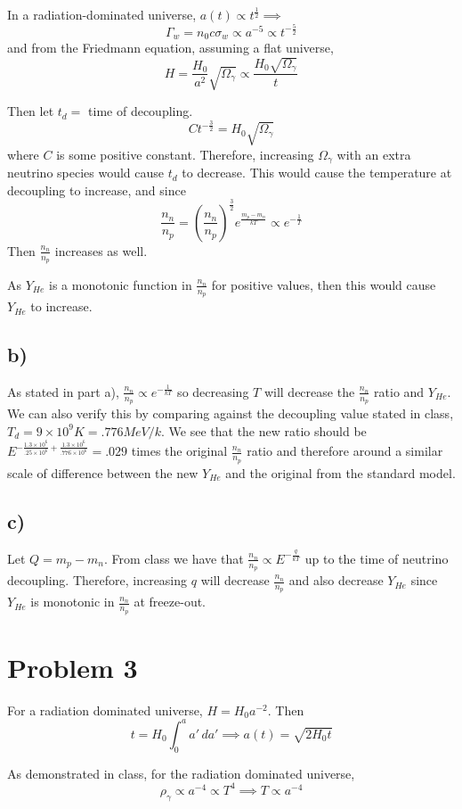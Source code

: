 \documentclass{article}
\begin{document}
In a radiation-dominated universe, $a(t)\propto t^{\frac{1}{2}}\implies$
\[\Gamma_w = n_0c\sigma_w\propto a^{-5}\propto t^{-\frac{5}{2}}\]
and from the Friedmann equation, assuming a flat universe,
\[H = \frac{H_0}{a^2}\sqrt{\Omega_\gamma} \propto \frac{H_0\sqrt{\Omega_\gamma}}{t}\]

Then let $t_d=$ time of decoupling.
\[C t^{-\frac{3}{2}} = H_0\sqrt{\Omega_\gamma}\]
where $C$ is some positive constant. Therefore, increasing $\Omega_\gamma$ with an extra neutrino species would cause $t_d$ to decrease. This would cause the temperature at decoupling to increase, and since
\[\frac{n_n}{n_p} = \left(\frac{n_n}{n_p}\right)^{\frac{3}{2}}e^{\frac{m_p-m_n}{kT}}\propto e^{-\frac{1}{T}}\]
Then $\frac{n_n}{n_p}$ increases as well.

As $Y_{He}$ is a monotonic function in $\frac{n_n}{n_p}$ for positive values, then this would cause $Y_{He}$ to increase.

\subsection*{b)}
As stated in part a), $\frac{n_n}{n_p}\propto e^{-\frac{1}{kT}}$ so decreasing $T$ will decrease the $\frac{n_n}{n_p}$ ratio and $Y_{He}$. We can also verify this by comparing against the decoupling value stated in class, $T_d = 9\times 10^9 K = .776 MeV/k$. We see that the new ratio should be $E^{-\frac{1.3\times 10^6}{.25\times 10^6}+\frac{1.3\times 10^6}{.776\times 10^6}}=	.029$ times the original $\frac{n_n}{n_p}$ ratio and therefore around a similar scale of difference between the new $Y_{He}$ and the original from the standard model.

\subsection*{c)}
Let $Q=m_p-m_n$. From class we have that $\frac{n_n}{n_p} \propto E^{-\frac{q}{kT}}$ up to the time of neutrino decoupling. Therefore, increasing $q$ will decrease $\frac{n_n}{n_p}$ and also decrease $Y_{He}$ since $Y_{He}$ is monotonic in $\frac{n_n}{n_p}$ at freeze-out.

\section*{Problem 3}
For a radiation dominated universe, $H = H_0 a^{-2}$. Then
\[t=H_0\int_0^a a'\,da'\implies a(t) = \sqrt{2H_0 t}\]

As demonstrated in class, for the radiation dominated universe,
\[\rho_\gamma\propto a^{-4}\propto T^4\implies T\propto a^{-4}\]
\end{document}
